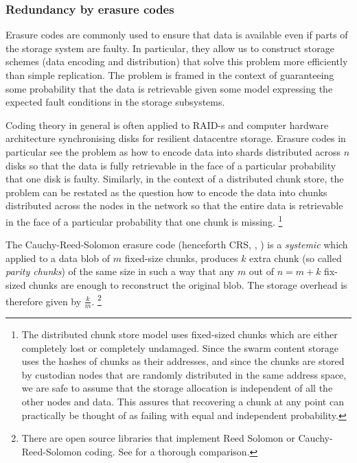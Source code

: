 \subsubsection{Redundancy by erasure codes}

Erasure codes are commonly used to ensure that data is available even if parts of the storage system are faulty. In particular, they allow us to construct storage schemes (data encoding and distribution) that solve this problem more efficiently than simple replication. The problem is framed in the context of guaranteeing some probability that the data is retrievable given some model expressing the expected fault conditions in the storage subsystems.

Coding theory in general is often applied to RAID-s and computer hardware architecture synchronising disks for resilient datacentre storage.
Erasure codes in particular see the problem as how to encode data into shards distributed across $n$ disks so that the data is fully retrievable in the face of a particular probability that one disk is faulty.
Similarly, in the context of a distributed chunk store, the problem can be restated as the question how to encode the data into chunks distributed across the nodes in the network so that the entire data is retrievable in the face of a particular probability that one chunk is missing.%
%
\footnote{The distributed chunk store model uses fixed-sized chunks which are either completely lost or completely undamaged. Since the swarm content storage uses the hashes of chunks as their addresses, and since the chunks are stored by custodian nodes that are randomly distributed in the same address space, we are safe to assume that the storage allocation is independent of all the other nodes and data. This assures that recovering a chunk at any point can practically be thought of as failing with equal and independent probability.}


The Cauchy-Reed-Solomon erasure code (henceforth CRS, \cite{lubyetal1995CRS}, \cite{plank2006optimizing}) is a \emph{systemic}  which applied to a data blob of $m$ fixed-size chunks, produces $k$ extra chunk (so called \emph{parity chunks}) of the same size in such a way that any $m$ out of $n=m+k$ fix-sized chunks are enough to reconstruct the original blob. The storage overhead is therefore given by $\frac{k}{m}$.%
%
\footnote{%
There are open source libraries that implement Reed Solomon or Cauchy-Reed-Solomon coding. See \cite{plank2009performance} for a thorough comparison.}

